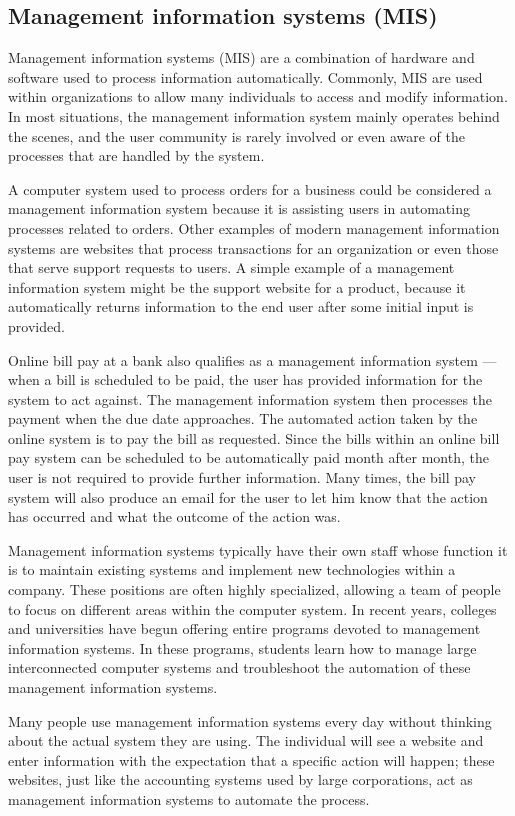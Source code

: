 \subsection*{Management information systems (MIS) }

Management information systems (MIS) are a combination of hardware and software used to process information automatically. Commonly, MIS are used within organizations to allow many individuals to access and modify information. In most situations, the management information system mainly operates behind the scenes, and the user community is rarely involved or even aware of the processes that are handled by the system.


A computer system used to process orders for a business could be considered a management information system because it is assisting users in automating processes related to orders. Other examples of modern management information systems are websites that process transactions for an organization or even those that serve support requests to users. A simple example of a management information system might be the support website for a product, because it automatically returns information to the end user after some initial input is provided.


Online bill pay at a bank also qualifies as a management information system — when a bill is scheduled to be paid, the user has provided information for the system to act against. The management information system then processes the payment when the due date approaches. The automated action taken by the online system is to pay the bill as requested. Since the bills within an online bill pay system can be scheduled to be automatically paid month after month, the user is not required to provide further information. Many times, the bill pay system will also produce an email for the user to let him know that the action has occurred and what the outcome of the action was.


Management information systems typically have their own staff whose function it is to maintain existing systems and implement new technologies within a company. These positions are often highly specialized, allowing a team of people to focus on different areas within the computer system. In recent years, colleges and universities have begun offering entire programs devoted to management information systems. In these programs, students learn how to manage large interconnected computer systems and troubleshoot the automation of these management information systems.


Many people use management information systems every day without thinking about the actual system they are using. The individual will see a website and enter information with the expectation that a specific action will happen; these websites, just like the accounting systems used by large corporations, act as management information systems to automate the process.


